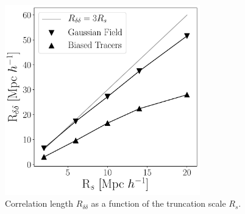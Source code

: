 \documentclass[usenatbib]{mnras}
\begin{document}
\begin{figure}
    \centering
    \includegraphics[width=240pt]{correlation_length.pdf}
    \caption{Correlation length $R_{\delta\delta}$ as a function of the truncation scale $R_s$.}
    \label{fig:correlation length}
\end{figure}
\end{document}
